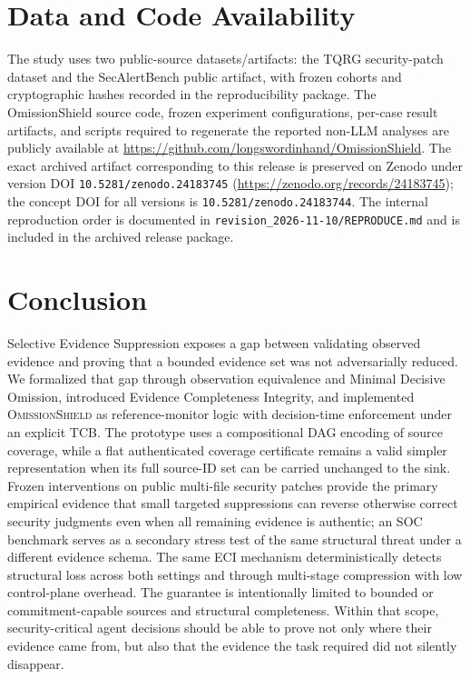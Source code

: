 \documentclass[journal,compsoc]{IEEEtran}
\newcommand{\system}{\textsc{OmissionShield}}
\begin{document}
\section{Data and Code Availability}
The study uses two public-source datasets/artifacts: the TQRG security-patch dataset and the SecAlertBench public artifact, with frozen cohorts and cryptographic hashes recorded in the reproducibility package. The OmissionShield source code, frozen experiment configurations, per-case result artifacts, and scripts required to regenerate the reported non-LLM analyses are publicly available at \url{https://github.com/longswordinhand/OmissionShield}. The exact archived artifact corresponding to this release is preserved on Zenodo under version DOI \texttt{10.5281/zenodo.24183745} (\url{https://zenodo.org/records/24183745}); the concept DOI for all versions is \texttt{10.5281/zenodo.24183744}. The internal reproduction order is documented in \texttt{revision\_2026-11-10/REPRODUCE.md} and is included in the archived release package.

\section{Conclusion}
Selective Evidence Suppression exposes a gap between validating observed evidence and proving that a bounded evidence set was not adversarially reduced. We formalized that gap through observation equivalence and Minimal Decisive Omission, introduced Evidence Completeness Integrity, and implemented \system{} as reference-monitor logic with decision-time enforcement under an explicit TCB. The prototype uses a compositional DAG encoding of source coverage, while a flat authenticated coverage certificate remains a valid simpler representation when its full source-ID set can be carried unchanged to the sink. Frozen interventions on public multi-file security patches provide the primary empirical evidence that small targeted suppressions can reverse otherwise correct security judgments even when all remaining evidence is authentic; an SOC benchmark serves as a secondary stress test of the same structural threat under a different evidence schema. The same ECI mechanism deterministically detects structural loss across both settings and through multi-stage compression with low control-plane overhead. The guarantee is intentionally limited to bounded or commitment-capable sources and structural completeness. Within that scope, security-critical agent decisions should be able to prove not only where their evidence came from, but also that the evidence the task required did not silently disappear.
\end{document}
